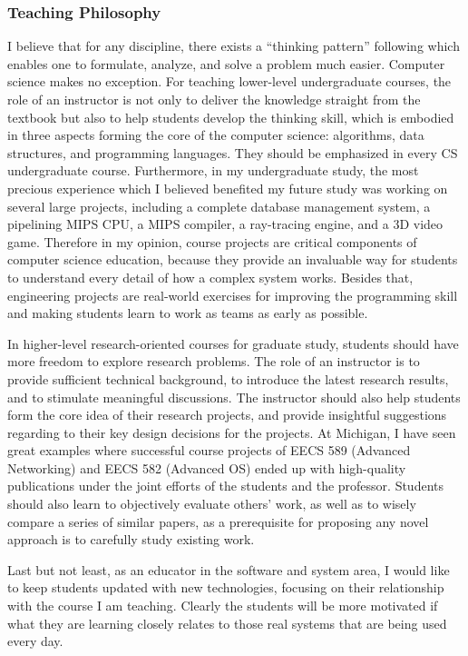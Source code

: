 \documentclass[10pt]{article}
\begin{document}
\begin{small}
\subsubsection*{Teaching Philosophy}

I believe that for any discipline, there exists a ``thinking pattern'' following which enables one to formulate, analyze, and solve a problem much easier. Computer science makes no exception. For teaching lower-level undergraduate courses, the role of an instructor is not only to deliver the knowledge straight from the textbook but also to help students develop the thinking skill, which is embodied in three aspects forming the core of the computer science: algorithms, data structures, and programming languages. They should be emphasized in every CS undergraduate course. Furthermore, in my undergraduate study, the most precious experience which I believed benefited my future study was working on several large projects, including a complete database management system, a pipelining MIPS CPU, a MIPS compiler, a ray-tracing engine, and a 3D video game. Therefore in my opinion, course projects are critical components of computer science education, because they provide an invaluable way for students to understand every detail of how a complex system works. Besides that, engineering projects are real-world exercises for improving the programming skill and making students learn to work as teams as early as possible.

In higher-level research-oriented courses for graduate study, students should have more freedom to explore research problems. The role of an instructor is to provide sufficient technical background, to introduce the latest research results, and to stimulate meaningful discussions. The instructor should also help students form the core idea of their research projects, and provide insightful suggestions regarding to their key design decisions for the projects. At Michigan, I have seen great examples where successful course projects of EECS 589 (Advanced Networking) and EECS 582 (Advanced OS) ended up with high-quality publications under the joint efforts of the students and the professor. Students should also learn to objectively evaluate others' work, as well as to wisely compare a series of similar papers, as a prerequisite for proposing any novel approach is to carefully study existing work.

Last but not least, as an educator in the software and system area, I would like to keep students updated with new technologies, focusing on their relationship with the course I am teaching. Clearly the students will be more motivated if what they are learning closely relates to those real systems that are being used every day.


\end{small}
\end{document}

